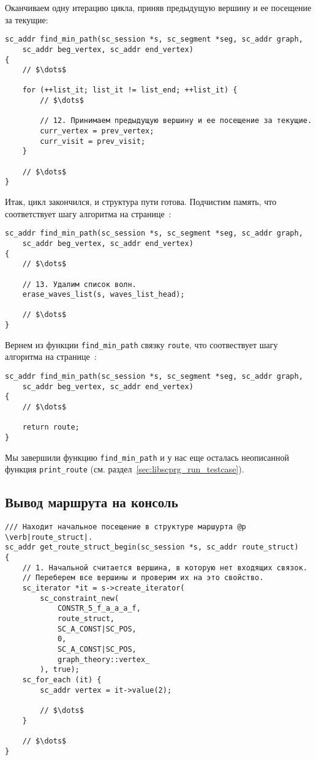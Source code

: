 Оканчиваем одну итерацию цикла, приняв предыдущую вершину и ее
посещение за текущие:

\begin{lstlisting}[texcl]
sc_addr find_min_path(sc_session *s, sc_segment *seg, sc_addr graph,
    sc_addr beg_vertex, sc_addr end_vertex)
{
    // $\dots$

    for (++list_it; list_it != list_end; ++list_it) {
        // $\dots$

        // 12. Принимаем предыдущую вершину и ее посещение за текущие.
        curr_vertex = prev_vertex;
        curr_visit = prev_visit;
    }

    // $\dots$
}
\end{lstlisting}

Итак, цикл закончился, и структура пути готова. Подчистим память, что
соответствует шагу алгоритма на
странице~\pageref{astep:S16_Erase_waves_list}:

\begin{lstlisting}[texcl]
sc_addr find_min_path(sc_session *s, sc_segment *seg, sc_addr graph,
    sc_addr beg_vertex, sc_addr end_vertex)
{
    // $\dots$

    // 13. Удалим список волн.
    erase_waves_list(s, waves_list_head);

    // $\dots$
}
\end{lstlisting}

Вернем из функции \lstinline|find_min_path| связку \lstinline|route|,
что соотвествует шагу алгоритма на
странице~\pageref{astep:S17_Result}:

\begin{lstlisting}[texcl]
sc_addr find_min_path(sc_session *s, sc_segment *seg, sc_addr graph,
    sc_addr beg_vertex, sc_addr end_vertex)
{
    // $\dots$

    return route;
}
\end{lstlisting}

Мы завершили функцию \lstinline|find_min_path| и у нас еще осталась
неописанной функция \lstinline|print_route|
(см. раздел~\ref{sec:libscprg_run_testcase}).

\subsection{Вывод маршрута на консоль}
\label{sec:libscprg_fmp_print_route}

\begin{lstlisting}[texcl]
/// Находит начальное посещение в структуре маршурта @p \verb|route_struct|.
sc_addr get_route_struct_begin(sc_session *s, sc_addr route_struct)
{
    // 1. Начальной считается вершина, в которую нет входящих связок.
    // Переберем все вершины и проверим их на это свойство.
    sc_iterator *it = s->create_iterator(
        sc_constraint_new(
            CONSTR_5_f_a_a_a_f,
            route_struct,
            SC_A_CONST|SC_POS,
            0,
            SC_A_CONST|SC_POS,
            graph_theory::vertex_
        ), true);
    sc_for_each (it) {
        sc_addr vertex = it->value(2);

        // $\dots$
    }

    // $\dots$
}
\end{lstlisting}

